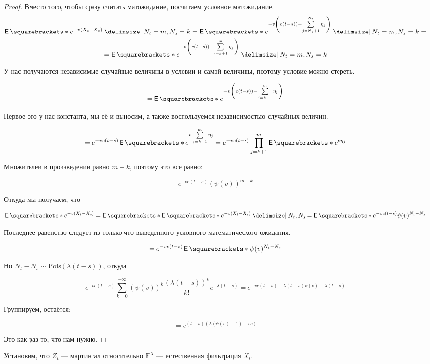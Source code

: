 \begin{proof}
  Вместо того, чтобы сразу считать матожидание, посчитаем условное матожидание.
  \begin{multline}
    \E{e^{-v(X_t - X_s)} \given N_t = m, N_s = k} = 
    \E{e^{-v\left(c(t - s)) - \sum\limits_{j = N_s + 1}^{N_t} \eta_j\right)} \given
    N_t = m, N_s = k} =\\= \E{e^{-v\left(c(t - s)) - \sum\limits_{j = k + 1}^{m} 
    \eta_j\right)} \given N_t = m, N_s = k}
  \end{multline}

  У нас получаются независимые случайные величины в условии и самой величины,
  поэтому условие можно стереть.

  \[
    = \E{e^{-v\left(c(t - s)) - \sum\limits_{j = k + 1}^{m} 
    \eta_j\right)}}
  \]

  Первое это у нас константа, мы её и выносим, а также воспользуемся независимостью
  случайных величин.

  \[
    = e^{-vc(t - s)}\E{e^{v\sum\limits_{j = k + 1}^{m} 
    \eta_j}} = e^{-vc(t - s)} \prod_{j = k + 1}^m \E{e^{v\eta_j}}
  \]

  Множителей в произведении равно $m - k$, поэтому это всё равно:

  \[
    e^{-vc(t - s)} (\psi(v))^{m - k}
  \]

  Откуда мы получаем, что

  \[
    \E{e^{-v(X_t - X_s)}} = \E{\E{e^{-v(X_t - X_s)} \given N_t, N_s}} =
    \E{e^{-vc(t - s)} \psi(v)^{N_t - N_s}}
  \]

  Последнее равенство следует из только что выведенного условного математического
  ожидания.

  \[
    = e^{-vc(t - s)}\E{\psi(v)^{N_t - N_s}}
  \]

  Но $N_t - N_s \sim \mathrm{Pois}(\lambda(t - s))$, откуда

  \[
    e^{-vc(t - s)} \sum\limits_{k = 0}^{+\infty} (\psi(v))^k \frac{(\lambda(t - 
    s))^k}{k!}  e^{-\lambda(t - s)} = e^{-vc(t- s) + \lambda(t - s)\psi(v) -
     \lambda(t - s)}
  \]

  Группируем, остаётся:

  \[
    = e^{(t - s)(\lambda(\psi(v) - 1) - vc)}
  \]

  Это как раз то, что нам нужно.
\end{proof}

Установим, что $Z_t$ --- мартингал относительно $\mathbb{F}^X$ --- естественная
фильтрация $X_t$.

